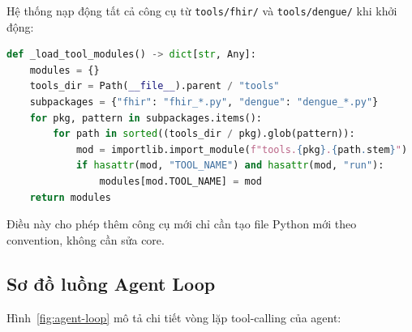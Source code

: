 \documentclass[oneside, a4paper]{book}
\theoremstyle{plain}
\theoremstyle{plain}
\theoremstyle{definition}
\theoremstyle{remark}
\begin{document}
Hệ thống nạp động tất cả công cụ từ \texttt{tools/fhir/} và \texttt{tools/dengue/} khi khởi động:

\begin{lstlisting}[language=Python, caption={Nạp động công cụ từ filesystem}]
def _load_tool_modules() -> dict[str, Any]:
    modules = {}
    tools_dir = Path(__file__).parent / "tools"
    subpackages = {"fhir": "fhir_*.py", "dengue": "dengue_*.py"}
    for pkg, pattern in subpackages.items():
        for path in sorted((tools_dir / pkg).glob(pattern)):
            mod = importlib.import_module(f"tools.{pkg}.{path.stem}")
            if hasattr(mod, "TOOL_NAME") and hasattr(mod, "run"):
                modules[mod.TOOL_NAME] = mod
    return modules
\end{lstlisting}

Điều này cho phép thêm công cụ mới chỉ cần tạo file Python mới theo convention, không cần sửa core.

\subsection{Sơ đồ luồng Agent Loop}

Hình~\ref{fig:agent-loop} mô tả chi tiết vòng lặp tool-calling của agent:
\end{document}

